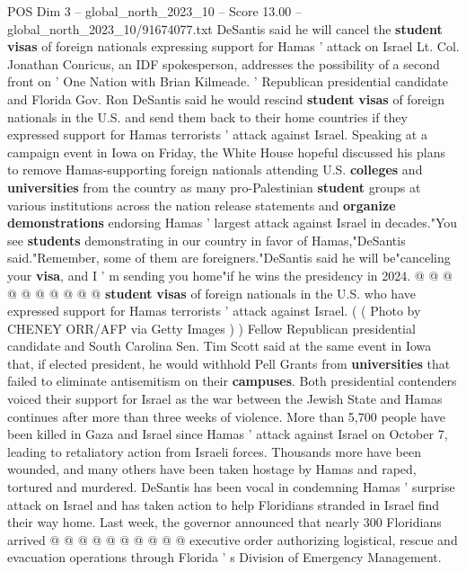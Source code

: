 \begin{textsample}{POS Dim 3 – global\_north\_2023\_10 – Score 13.00 – global\_north\_2023\_10/91674077.txt}  \label{ex:f3_pos_277}
DeSantis said he will cancel the \textbf{student} \textbf{visas} of foreign nationals expressing support for Hamas ' attack on Israel Lt.
Col.
Jonathan Conricus, an IDF spokesperson, addresses the possibility of a second front on ' One Nation with Brian Kilmeade. ' Republican presidential candidate and Florida Gov.
Ron DeSantis said he would rescind \textbf{student} \textbf{visas} of foreign nationals in the U.S. and send them back to their home countries if they expressed support for Hamas terrorists ' attack against Israel.
Speaking at a campaign event in Iowa on Friday, the White House hopeful discussed his plans to remove Hamas-supporting foreign nationals attending U.S. \textbf{colleges} and \textbf{universities} from the country as many pro-Palestinian \textbf{student} groups at various institutions across the nation release statements and \textbf{organize} \textbf{demonstrations} endorsing Hamas ' largest attack against Israel in decades."You see \textbf{students} demonstrating in our country in favor of Hamas,"DeSantis said."Remember, some of them are foreigners."DeSantis said he will be"canceling your \textbf{visa}, and I ' m sending you home"if he wins the presidency in 2024. @ @ @ @ @ @ @ @ @ @ \textbf{student} \textbf{visas} of foreign nationals in the U.S. who have expressed support for Hamas terrorists ' attack against Israel. ( ( Photo by CHENEY ORR/AFP via Getty Images ) ) Fellow Republican presidential candidate and South Carolina Sen.
Tim Scott said at the same event in Iowa that, if elected president, he would withhold Pell Grants from \textbf{universities} that failed to eliminate antisemitism on their \textbf{campuses}.
Both presidential contenders voiced their support for Israel as the war between the Jewish State and Hamas continues after more than three weeks of violence.
More than 5,700 people have been killed in Gaza and Israel since Hamas ' attack against Israel on October 7, leading to retaliatory action from Israeli forces.
Thousands more have been wounded, and many others have been taken hostage by Hamas and raped, tortured and murdered.
DeSantis has been vocal in condemning Hamas ' surprise attack on Israel and has taken action to help Floridians stranded in Israel find their way home.
Last week, the governor announced that nearly 300 Floridians arrived @ @ @ @ @ @ @ @ @ @ executive order authorizing logistical, rescue and evacuation operations through Florida ' s Division of Emergency Management.

\end{textsample}
